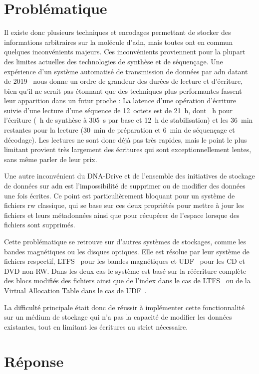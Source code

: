 \documentclass[a4paper]{report}
\makeatletter
\newcommand{\ltfs}{LTFS~\cite{pease2010linear}\@\xspace}
\newcommand{\udf}{UDF~\cite{optical2003universal}\@\xspace}
\makeatother
\begin{document}
\section{Problématique}

Il existe donc plusieurs techniques et encodages permettant de stocker des informations arbitraires sur la molécule d'\ac{adn},
mais toutes ont en commun quelques inconvénients majeurs.
Ces inconvénients proviennent pour la plupart des limites actuelles des technologies de synthèse et de séquençage.
Une expérience d'un système automatisé de transmission de données par \ac{adn} datant de 2019~\cite{takahashi2019demonstration}
nous donne un ordre de grandeur des durées de lecture et d'écriture,
bien qu'il ne serait pas étonnant que des techniques plus performantes fassent leur apparition dans un futur proche :
La latence d'une opération d'écriture suivie d'une lecture d'une séquence de 12~octets est de 21~h,
dont ~h pour l'écriture (~h de synthèse à 305~s par base et 12~h de stabilisation)
et les 36~min restantes pour la lecture (30~min de préparation et 6~min de séquençage et décodage).
Les lectures ne sont donc déjà pas très rapides, mais le point le plus limitant provient très largement des écritures qui sont exceptionnellement lentes, sans même parler de leur prix.

Une autre inconvénient du DNA-Drive et de l'ensemble des initiatives de stockage de données sur \ac{adn} est l'impossibilité de supprimer ou de modifier des données une fois écrites.
Ce point est particulièrement bloquant pour un système de fichiers \ac{rw} classique,
qui se base sur ces deux propriétés pour mettre à jour les fichiers et leurs métadonnées ainsi que pour récupérer de l'espace lorsque des fichiers sont supprimés.

Cette problématique se retrouve sur d'autres systèmes de stockages, comme les bandes magnétiques ou les disques optiques.
Elle est résolue par leur système de fichiers respectif, \ltfs pour les bandes magnétiques et \udf pour les CD et DVD non-RW.
Dans les deux cas le système est basé sur la réécriture complète des blocs modifiés des fichiers ainsi que de l'index dans le cas de \ltfs ou de la Virtual Allocation Table dans le cas de \udf.

La difficulté principale était donc de réussir à implémenter cette fonctionnalité sur un médium de stockage qui n'a pas la capacité de modifier les données existantes, tout en limitant les écritures au strict nécessaire.


\section{Réponse}
\end{document}
